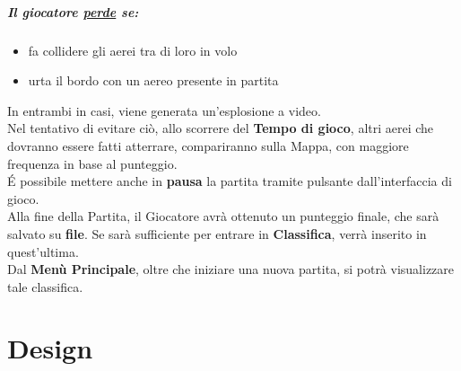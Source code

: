 \documentclass[a4paper,12pt]{report}
\begin{document}
\paragraph{Il giocatore \underline{perde} se:}
\begin{itemize}
    \item fa collidere gli aerei tra di loro in volo
    \item urta il bordo con un aereo presente in partita
\end{itemize}
In entrambi in casi, viene generata un'esplosione a video.
\\
Nel tentativo di evitare ciò, allo scorrere del \textbf{Tempo di gioco}, altri aerei che dovranno essere fatti atterrare, compariranno sulla Mappa, con maggiore frequenza in base al punteggio.
\\
É possibile mettere anche in \textbf{pausa} la partita tramite pulsante dall’interfaccia di gioco.
\\
Alla fine della Partita, il Giocatore avrà ottenuto un punteggio finale, che sarà salvato su \textbf{file}. Se sarà sufficiente per entrare in \textbf{Classifica}, verrà inserito in quest’ultima.
\\
Dal \textbf{Menù Principale}, oltre che iniziare una nuova partita, si potrà visualizzare tale classifica.



\chapter{Design}
\end{document}
